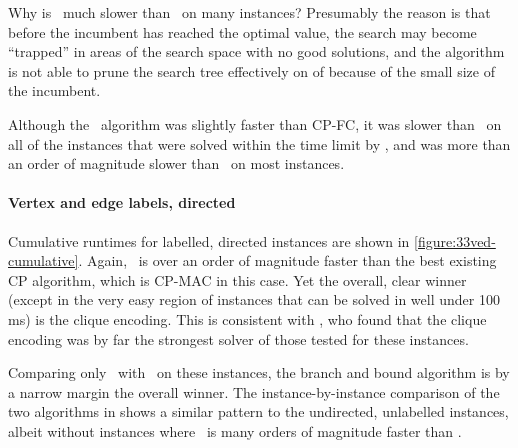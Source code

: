 Why is \McSplit\ much slower than \McSplitDown\ on many instances?  Presumably
the reason is that before the incumbent has reached the optimal value,
the search may become ``trapped'' in areas of the search space with no good solutions,
and the algorithm is not able to prune the search tree effectively
on  of  because of the
small size of the incumbent.

Although the \kDown\ algorithm was slightly faster than CP-FC, it was slower
than \McSplitDown\ on all of the instances that were solved within the time
limit by \kDown, and was more than an order of magnitude slower than \McSplitDown\
on most instances.








\paragraph{Vertex and edge labels, directed} Cumulative runtimes for labelled,
directed instances are shown in \cref{figure:33ved-cumulative}. Again, \McSplit\ is over
an order of magnitude faster than the best existing CP algorithm, which is
CP-MAC in this case. Yet the overall, clear winner
(except in the very easy region of instances that can be solved in well under 100 ms)
is the clique encoding.  This is consistent with
\citet{DBLP:conf/cp/McCreeshNPS16}, who found that the clique encoding was by far
the strongest solver of those tested for these instances.

Comparing only \McSplit\ with \McSplitDown\ on these instances, the branch and bound
algorithm is by a narrow margin the overall winner.  The instance-by-instance
comparison of the two algorithms in \Cref{figure:33ved-scatter} shows a similar pattern
to the undirected, unlabelled instances, albeit without instances where \McSplitDown\
is many orders of magnitude faster than \McSplit.

